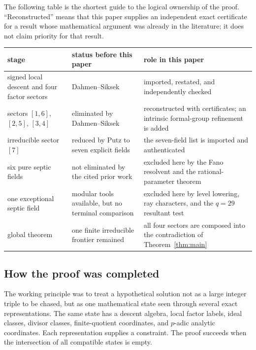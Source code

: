 \documentclass[11pt]{article}
\theoremstyle{definition}
\theoremstyle{remark}
\begin{document}
The following table is the shortest guide to the logical ownership of the
proof.  ``Reconstructed'' means that this paper supplies an independent
exact certificate for a result whose mathematical argument was already in
the literature; it does not claim priority for that result.

\begin{center}
\small
\renewcommand{\arraystretch}{1.18}
\begin{tabular}{@{}>{\raggedright\arraybackslash}p{}
                    >{\raggedright\arraybackslash}p{}
                    >{\raggedright\arraybackslash}p{}@{}}
\toprule
stage & status before this paper & role in this paper\\
\midrule
signed local descent and four factor sectors
 & Dahmen--Siksek
 & imported, restated, and independently checked\\
sectors $[1,6]$, $[2,5]$, $[3,4]$
 & eliminated by Dahmen--Siksek
 & reconstructed with certificates; an intrinsic formal-group refinement is added\\
irreducible sector $[7]$
 & reduced by Putz to seven explicit fields
 & the seven-field list is imported and authenticated\\
six pure septic fields
 & not eliminated by the cited prior work
 & excluded here by the Fano resolvent and the rational-parameter theorem\\
one exceptional septic field
 & modular tools available, but no terminal comparison
 & excluded here by level lowering, ray characters, and the $q=29$ resultant test\\
global theorem
 & one finite irreducible frontier remained
 & all four sectors are composed into the contradiction of Theorem~\ref{thm:main}\\
\bottomrule
\end{tabular}
\normalsize
\end{center}

\subsection{How the proof was completed}

The working principle was to treat a hypothetical solution not as a large
integer triple to be chased, but as one mathematical state seen through
several exact representations.  The same state has a descent algebra, local
factor labels, ideal classes, divisor classes, finite-quotient coordinates,
and $p$-adic analytic coordinates.  Each representation supplies a
constraint.  The proof succeeds when the intersection of all compatible
states is empty.
\end{document}
